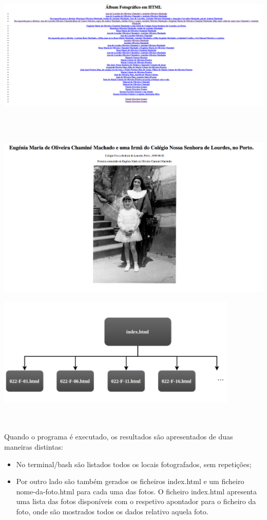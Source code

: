 \documentclass{report}
\begin{document}
\\
\\
\begin{center}
\includegraphics[scale=0.2]{3}
\end{center}
\\
\\
\begin{center}
\includegraphics[scale=0.3]{4}
\end{center}
\newpage
\begin{center}
\includegraphics[scale=1]{5}
\end{center}
\\
\\
Quando o programa é executado, os resultados são apresentados de duas maneiras distintas:
\\
\begin{itemize}
    \item No terminal/bash são listados todos os locais fotografados, sem repetições;
    \item Por outro lado são também gerados os ficheiros index.html e um ficheiro nome-da-foto.html para cada uma das fotos. O ficheiro index.html apresenta uma lista das fotos disponíveis com o respetivo apontador para o ficheiro da foto, onde são mostrados todos os dados relativo aquela foto.
\end{itemize}
\\
\\
\end{document}

